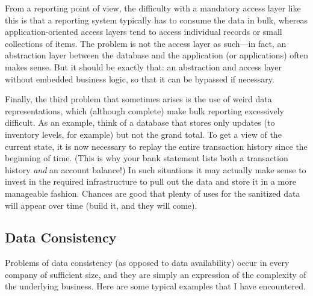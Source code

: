 From a reporting point of view, the difficulty with a mandatory access
layer like this is that a reporting system typically has to consume
the data in bulk, whereas application-\break oriented access layers tend to
access individual records or small collections of items. The problem
is not the access layer as such---in fact, an abstraction layer
between the database and the application (or applications) often makes
sense.  But it should be exactly that: an abstraction and access layer
without embedded business logic, so that it can be bypassed if
necessary.
    
Finally, the third problem that sometimes arises is the use of weird
data representations, which (although complete) make bulk reporting
excessively difficult.  As an example, think of a database that stores
only updates (to inventory levels, for example) but not the grand
total. To get a view of the current state, it is now necessary to
replay the entire transaction history since the beginning of time.
(This is why your bank statement lists both a transaction history
\emph{and} an account balance!) In such situations it may actually
make sense to invest in the required infrastructure to pull out the
data and store it in a more manageable fashion.  Chances are good that
plenty of uses for the sanitized data will appear over time (build it,
and they will come).

\vspace*{-6pt}
\subsection{Data Consistency}
 
    
Problems of data consistency (as opposed to data availability) occur
in every company of sufficient size, and they are simply an expression
of the complexity of the underlying business. Here are some typical
examples that I have encountered.

